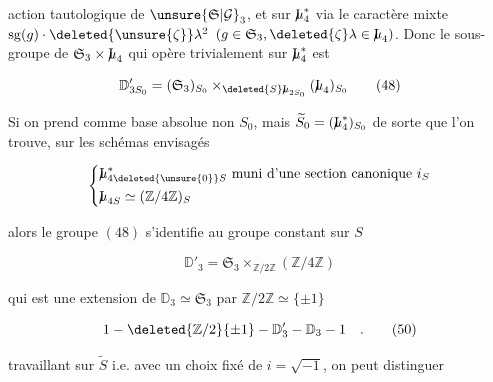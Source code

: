 
action tautologique de $\unsure{\mathfrak S|\mathcal G}_3$, et sur $\mathord{\mathrm{I}\mkern-7mu\mu}_4^*$ via le caractère mixte $\operatorname{sg}(g)\cdot\deleted{\unsure{\zeta}}\lambda^2$ $(g\in \mathfrak S_3,\deleted{\zeta}\lambda\in \mathord{\mathrm{I}\mkern-7mu\mu}_4)$. Donc le sous-groupe de $\mathfrak S_3\times \mathord{\mathrm{I}\mkern-7mu\mu}_4$ qui opère trivialement sur $\mathord{\mathrm{I}\mkern-7mu\mu}_4^*$ est

\[
\mathbb D'_{3S_0}=(\mathfrak S_3)_{S_0}\times_{\deleted{S}\mathord{\mathrm{I}\mkern-7mu\mu}_{2S_0}}(\mathord{\mathrm{I}\mkern-7mu\mu}_4)_{S_0}
\tag*{(48)}
\]

Si on prend comme base absolue non $S_0$, mais $\widetilde S_0=(\mathord{\mathrm{I}\mkern-7mu\mu}_4^*)_{S_0}$ de sorte que l'on trouve, sur les schémas  envisagés

\[
\left\{\begin{aligned}
&\mathord{\mathrm{I}\mkern-7mu\mu}_{4\deleted{\unsure{0}}S}^*\ \text{muni d'une section canonique }i_S\\
&\mathord{\mathrm{I}\mkern-7mu\mu}_{4S}\simeq(\mathbb Z/4\mathbb Z)_S
\end{aligned}\right.
\]

alors le groupe $(48)$ s'identifie au groupe constant sur $S$  

\[
\mathbb D'_3=\mathfrak S_3\times_{\mathbb Z/2\mathbb Z}(\mathbb Z/4\mathbb Z)
\tag*{(49)}
\]

qui est une extension de $\mathbb D_3\simeq \mathfrak S_3$ par $\mathbb Z/2\mathbb Z\simeq\{\pm1\}$

\[
1\mathbin{\relbar}\deleted{\mathbb Z/2}\{\pm1\}\mathbin{\relbar}\mathbb D'_3\mathbin{\relbar}\mathbb D_3\mathbin{\relbar}1\quad .
\tag*{(50)}
\]

   travaillant sur $\widetilde S$ i.e. avec un choix fixé de $i=\sqrt{-1}$, on peut distinguer

